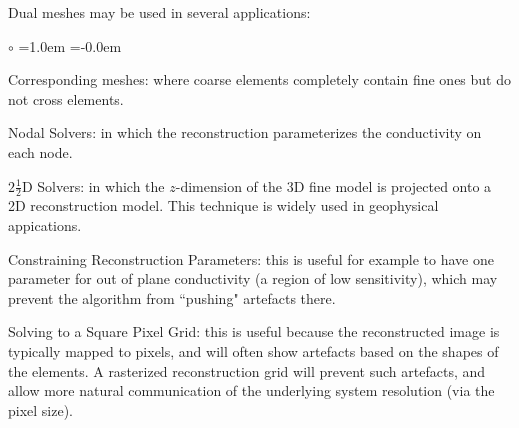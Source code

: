 \documentclass[letterpaper,twocolumn,10pt]{article}
\begin{document}
Dual meshes may be used in several applications:
\begin{list}{$\circ$} %
  {\leftmargin=1.0em \itemindent=-0.0em
    \baselineskip
    \baselineskip}
\item
   Corresponding meshes: where 
   coarse elements completely contain fine ones but do not
   cross elements.
\item
   Nodal Solvers: in which the reconstruction parameterizes
   the conductivity on each node\cite{graham2006}.
\item
   $2\frac{1}{2}$D Solvers: in which the $z$-dimension of the
     3D fine model is projected onto a 2D reconstruction model.
     This technique is widely used in geophysical appications.
\item
   Constraining Reconstruction Parameters:
      this is useful for example to have one parameter
      for out of plane conductivity (a region of low sensitivity),
      which may prevent the algorithm from ``pushing" artefacts there.
\item
   Solving to a Square Pixel Grid: this is useful because the
       reconstructed image is typically mapped to pixels, and
       will often show artefacts based on the shapes of the elements.
       A rasterized reconstruction grid will prevent such
       artefacts, and allow more natural communication of the
       underlying system resolution (via the pixel size).
\end{list}
\end{document}

